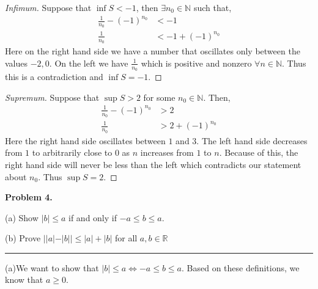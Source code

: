 \documentclass[leqno]{article}
\theoremstyle{nonumberplain}
\newtheorem{proof}{Proof}
\begin{document}
\begin{proof}[Infimum]
Suppose that $\inf S < -1$, then $\exists n_0 \in \mathbb{N}$ such that,
\begin{align*}
\frac{1}{n_0}-(-1)^{n_0} &< -1\\
\frac{1}{n_0}&<-1+(-1)^{n_0}
\end{align*}
Here on the right hand side we have a number that oscillates only between the values $-2,0$.  On the left we have $\frac{1}{n_0}$ which is positive and nonzero $\forall n \in \mathbb{N}$.  Thus this is a contradiction and $\inf S =-1$. 
\end{proof}

\begin{proof}[Supremum]
Suppose that $\sup S >2$ for some $n_0 \in \mathbb{N}$.  Then,
\begin{align*}
\frac{1}{n_0} - (-1)^{n_0} &> 2\\
\frac{1}{n_0} &> 2+ (-1)^{n_0}
\end{align*}
Here the right hand side oscillates between $1$ and $3$.  The left hand side decreases from $1$ to arbitrarily close to $0$ as $n$ increases from $1$ to $n$.  Because of this, the right hand side will never be less than the left which contradicts our statement about $n_0$.  Thus $\sup S=2$.

\end{proof}


\pagebreak




\noindent\textbf{Problem 4.} 

(a) Show $|b| \leq a$ if and only if $-a\leq b \leq a$.  

(b) Prove $||a|-|b||\leq |a|+|b|$ for all $a,b \in \mathbb{R}$

\noindent\rule[0.5ex]{\linewidth}{1pt}

(a)We want to show that $|b| \leq a \iff -a \leq b \leq a$.  Based on these definitions, we know that $a \geq 0$.  
\end{document}
